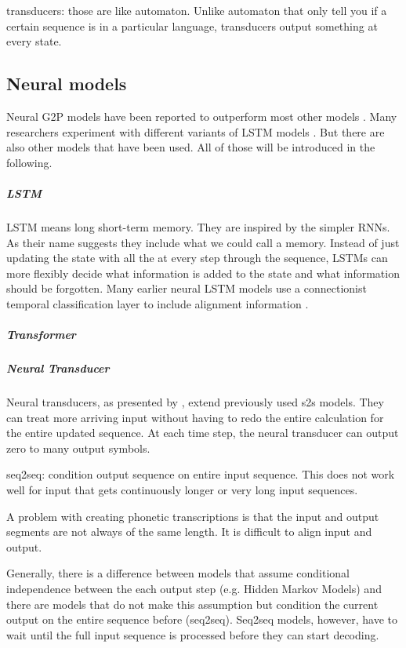 
transducers: those are like automaton. Unlike automaton that only tell you if a certain sequence is in a particular language, transducers output something at every state. 

\subsection{Neural models}
Neural G2P models have been reported to outperform most other models \citep{Lee&Ashby.2020}. Many researchers experiment with different variants of LSTM models \citep{Lee&Ashby.2020, hammond-2021-data, gautam.2021, Rao2015GraphemetophonemeCU}. But there are also other models that have been used. All of those will be introduced in the following.

\subparagraph{LSTM}
LSTM means long short-term memory. They are inspired by the simpler RNNs. As their name suggests they include what we could call a memory. Instead of just updating the state with all the at every step through the sequence, LSTMs can more flexibly decide what information is added to the state and what information should be forgotten.
Many earlier neural LSTM models use a connectionist temporal classification layer to include alignment information \citep{lo-nicolai-2021-linguistic}. 

\subparagraph{Transformer}

\subparagraph{Neural Transducer}
Neural transducers, as presented by \citet{jaitly2016neural}, extend previously used \ac{s2s} models. They can treat more arriving input without having to redo the entire calculation for the entire updated sequence. At each time step, the neural transducer can output zero to many output symbols. 


seq2seq: condition output sequence on entire input sequence. This does not work well for input that gets continuously longer or very long input sequences. 


A problem with creating phonetic transcriptions is that the input and output segments are not always of the same length. It is difficult to align input and output. 


Generally, there is a difference between models that assume conditional independence between the each output step (e.g. Hidden Markov Models) and there are models that do not make this assumption but condition the current output on the entire sequence before (seq2seq). Seq2seq models, however, have to wait until the full input sequence is processed before they can start decoding. 

